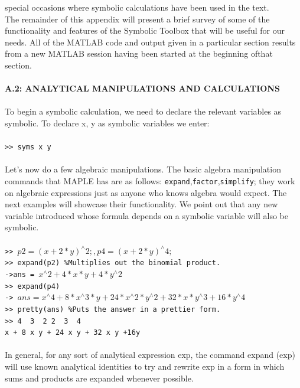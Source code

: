 \documentclass[../main.tex]{subfiles}
\begin{document}
special occasions where symbolic calculations have been used in the text.\\ 
The remainder of this appendix will present a brief survey of some of the 
functionality and features of the Symbolic Toolbox that will be useful for our 
needs. All of the MATLAB code and output given in a particular section results 
from a new MATLAB session having been started at the beginning ofthat section.
\\
\\
\textbf{A.2: ANALYTICAL MANIPULATIONS AND CALCULATIONS }
\\
\\
To begin a symbolic calculation, we need to declare the relevant variables as 
symbolic. To declare x, y as symbolic variables we enter: \\
\\
\texttt{>> syms x y}
\\
\\
Let's now do a few algebraic manipulations. The basic algebra manipulation 
commands that MAPLE has are as follows: \texttt{expand},\texttt{factor},\texttt{simplify}; they 
work on algebraic expressions just as anyone who knows algebra would expect. 
The next examples will showcase their functionality. We point out that any new 
variable introduced whose formula depends on a symbolic variable will also be 
symbolic. 
\\
\\
\texttt{>> $p2=(x+2*y)^{\wedge}2 ; , p4= (x+2*y)^{\wedge}4;$ }\\
\texttt{>> expand(p2) \%Multiplies out the binomial product. }\\
\texttt{->ans = $x^{\wedge}2+4*x*y+4*y^{\wedge}2$}\\
\texttt{>> expand(p4)}\\
\texttt{-> $ans=x^{\wedge}4+8*x^{\wedge}3*y+24*x^{\wedge}2*y^{\wedge}2+32*x*y^{\wedge}3+16*y^{\wedge}4$}\\
\texttt{>> pretty(ans) \%Puts the answer in a prettier form.}\\
\texttt{>> 4 ~3~ 2 2 ~3~ 4 }\\
\texttt{x + 8 x y + 24 x y + 32 x y +16y}
\\
\\
In general, for any sort of analytical expression exp, the command 
expand (exp) will use known analytical identities to try and rewrite exp in a 
form in which sums and products are expanded whenever possible. 
\\
\\
\end{document}
